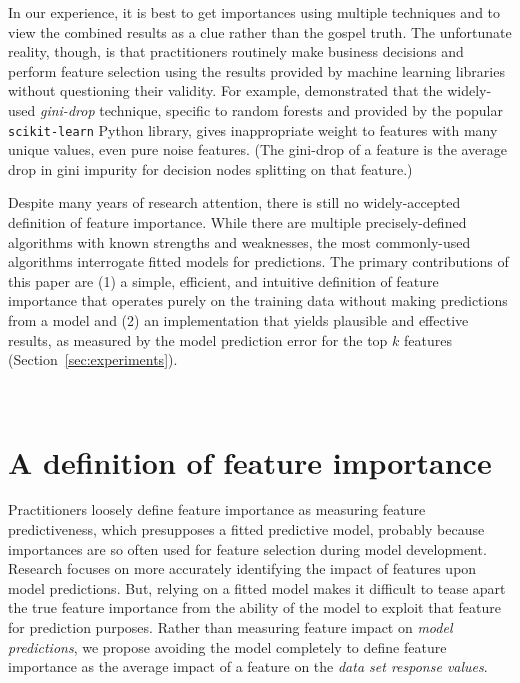 \documentclass[12pt]{article}
\newcommand{\secref}[1]{Section~\ref{#1}}
\newcommand{\todo}[1]{{{\color{red}{[#1]}}}}
\begin{document}
In our experience, it is best to get importances using multiple techniques and to view the combined results as a clue rather than the gospel truth.  The unfortunate reality, though, is that practitioners routinely make business decisions and  perform feature selection using the results provided by machine learning libraries without questioning their validity.  For example, \cite{rfpimp} demonstrated that the widely-used {\em gini-drop} technique, specific to random forests and provided by the popular {\tt scikit-learn} Python library, gives inappropriate weight to features with many unique values, even pure noise features. (The gini-drop of a feature is the average drop in gini impurity for decision nodes splitting on that feature.) \todo{transition}

Despite many years of research attention, there is still no widely-accepted definition of feature importance. While there are multiple precisely-defined algorithms with known strengths and weaknesses,  the most commonly-used algorithms interrogate fitted models for predictions. The primary contributions of this paper are (1) a simple, efficient, and intuitive definition of feature importance that operates purely on the training data without making predictions from a model and (2) an implementation that yields plausible and effective results, as measured by the model prediction error for the top $k$ features (\secref{sec:experiments}). \todo{probably need to say regression versus classifier here.}

~\\
\noindent \todo{Likely a good spot for a paper walk-through}

\section{A definition of feature importance}\label{sec:def}

Practitioners loosely define feature importance as measuring feature predictiveness, which presupposes a fitted predictive model, probably because importances are so often used for feature selection during model development.  Research  focuses on more accurately identifying the impact of features upon model predictions.  But, relying on a fitted model makes it difficult to tease apart the true feature importance from the ability of the model to exploit that feature for prediction purposes. Rather than measuring feature impact on {\em model predictions}, we propose avoiding the model completely to define feature importance as the average impact of a feature on the {\em data set response values}.
\end{document}
